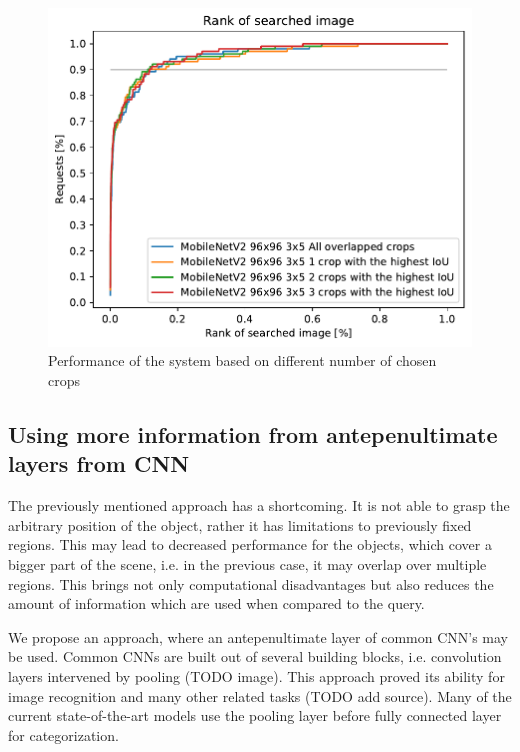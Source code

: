 \begin{figure}
\centering
\includegraphics[width=\textwidth]{graphs/5c4a781f8e6f3eac93db2083bde3963c06582a92a8141411bf29e41251a98e75.pdf}
\caption{Performance of the system based on different number of chosen crops}
\label{fig:crop_limitation}
\end{figure}


\subsection{Using more information from antepenultimate layers from CNN}


The previously mentioned approach has a shortcoming. It is not able to grasp the arbitrary position of the object, rather it has limitations to previously fixed regions. This may lead to decreased performance for the objects, which cover a bigger part of the scene, i.e. in the previous case, it may overlap over multiple regions. This brings not only computational disadvantages but also reduces the amount of information which are used when compared to the query.

We propose an approach, where an antepenultimate layer of common CNN's may be used. Common CNNs are built out of several building blocks, i.e. convolution layers intervened by pooling (TODO image). This approach proved its ability for image recognition and many other related tasks (TODO add source). Many of the current state-of-the-art models use the pooling layer before fully connected layer for categorization.

